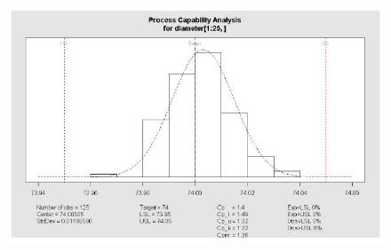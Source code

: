 \documentclass[MASTER-SPC.tex]{subfiles}
\begin{document}
			
			\begin{figure}[h!]
\centering
\includegraphics[width=1.1\linewidth]{proccapindices/qcchistogram}
\end{figure}
\end{document}
